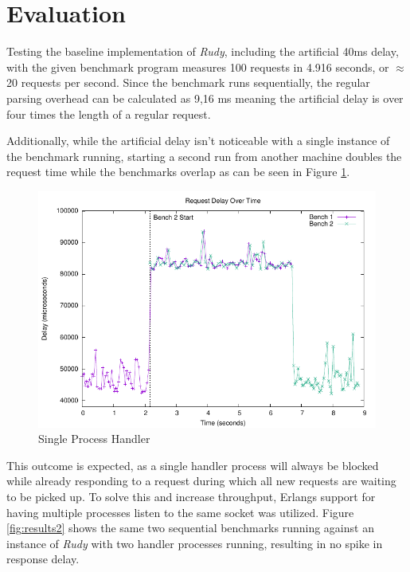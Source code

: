 \documentclass[a4paper, 11pt]{article}
\begin{document}
\section{Evaluation}

Testing the baseline implementation of \textit{Rudy}, including the artificial 40ms delay, with the given benchmark program measures 100 requests in 4.916 seconds, or $\approx$20 requests per second.
Since the benchmark runs sequentially, the regular parsing overhead can be calculated as 9,16 ms meaning the artificial delay is over four times the length of a regular request.

Additionally, while the artificial delay isn't noticeable with a single instance of the benchmark running, starting a second run from another machine doubles the request time while the benchmarks overlap as can be seen in Figure \ref{fig:results1}.

\begin{figure}[H]
  \begin{center}
    \includegraphics{graphs/requests-single-process/requests.pdf}
    \caption{Single Process Handler}
    \label{fig:results1}
  \end{center}
\end{figure}

This outcome is expected, as a single handler process will always be blocked while already responding to a request during which all new requests are waiting to be picked up.
To solve this and increase throughput, Erlangs support for having multiple processes listen to the same socket was utilized.
Figure \ref{fig:results2} shows the same two sequential benchmarks running against an instance of \textit{Rudy} with two handler processes running, resulting in no spike in response delay.
\end{document}
